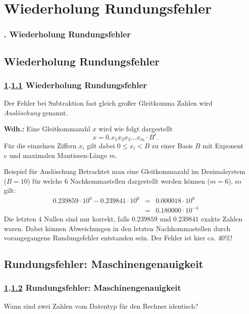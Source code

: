 \def\stitle{Wiederholung Rundungsfehler}
\section{\stitle}\label{K:wdh}
\begin{frame}
  \frametitle{\kap. \stitle}%
\tableofcontents[current]
\end{frame}
\subsection{\stitle}\label{S:rund}
\begin{frame}[t]%
 \frametitle{\ref{K:wdh}.\ref{S:rund} \stitle}

Der Fehler bei Subtraktion fast gleich gro\ss er Gleitkomma Zahlen wird \emph{Ausl\"oschung} genannt.
\medskip

\textbf{Wdh.: } Eine Gleitkommazahl $x$ wird wie folgt dargestellt
$$x = 0.x_1 x_2 x_3 ... x_m \cdot B^e.$$
F\"ur die einzelnen Ziffern $x_i$ gilt dabei $0 \leq x_i < B$ zu einer Basis $B$ mit Exponent $e$ und maximalen Mantissen-L\"ange $m$.
\begin{exampleblock}{Beispiel f\"ur Ausl\"oschung}
Betrachtet man eine Gleitkommazahl im Dezimalsystem ($B=10$) f\"ur welche $6$ Nachkommastellen dargestellt werden k\"onnen ($m=6$), so gilt:\\
\begin{eqnarray*}
0.239859 \cdot 10^0 - 0.239841 \cdot 10^0 &=& 0.000018 \cdot 10^0\\
 &=& 0.180000 \cdot 10^{-4}
\end{eqnarray*}
Die letzten $4$ Nullen sind nur korrekt, falls $0.239859$ und $0.239841$ exakte Zahlen waren.
Dabei k\"onnen Abweichungen in den letzten Nachkommastellen durch vorangegangene Rundungsfehler entstanden sein.
Der Fehler ist hier ca. $40\%$!
\medskip
\end{exampleblock}
\end{frame}


\def\stitle{Rundungsfehler: Maschinengenauigkeit}
\subsection{\stitle}\label{S:Maschinengenauigkeit}
\begin{frame}[t]%
 \frametitle{\ref{K:wdh}.\ref{S:Maschinengenauigkeit} \stitle}
 
Wann sind zwei Zahlen vom Datentyp  f\"ur den Rechner identisch?


\end{frame}

